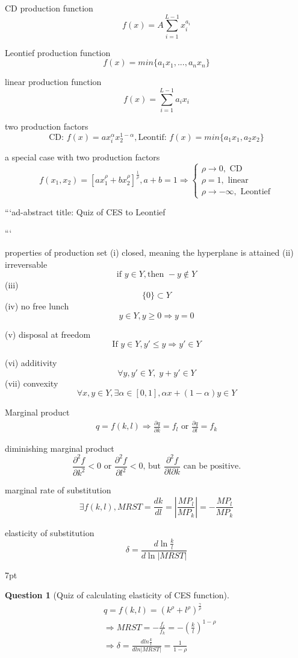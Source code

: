 \documentclass{article}
\newenvironment{redblock}{
\def\FrameCommand{
  \hspace{1pt}
    {\color{LightCoral}
    \vrule width 2pt}
    {\color{redshade}
    \vrule width 4pt}
  \colorbox{redshade}
}
\MakeFramed{
  \advance
  \hsize-
  \width
  \FrameRestore}
\noindent\hspace{-4.55pt}%
\begin{adjustwidth}{}{7pt}
\vspace{2pt}\vspace{2pt}
}
{\vspace{2pt}\end{adjustwidth}\endMakeFramed}
\newtheorem{question}{Question}
\begin{document}
CD production function
$$f(x)=A \sum\limits_{i=1}^{L-1}x_{i}^{a_{i}}$$

Leontief production function
$$f(x)=min\{a_{1} x_{1},...,a_{n}x_{n}\}$$

linear production function
$$f(x)=\sum\limits_{i=1}^{L-1}a_{i}x_{i}$$

two production factors
$$\text{CD: }f(x)=ax_{i}^{\alpha}x_{2}^{1-\alpha},\text{Leontif: }f(x)=min\{a_{1}x_{1},a_{2}x_{2}\}$$

a special case with two production factors
$$f(x_{1},x_{2})=[ax_{1}^{\rho}+bx_{2}^{\rho}]^{\frac{1}{\rho }},a+b=1 \Rightarrow \begin{cases} \rho \rightarrow 0, \text{ CD}\\
\rho=1, \text{ linear} \\
\rho \rightarrow -\infty ,\text{ Leontief}
\end{cases}$$

```ad-abstract
title: Quiz of CES to Leontief


```


properties of production set
(i)
closed, meaning the hyperplane is attained
(ii)
irreversable 
$$\text{if } y\in Y, \text{then }-y\notin Y$$
(iii)
$$\{0\}\subset Y$$
(iv)
no free lunch
$$y\in Y,y \geqslant 0 \Rightarrow y=0$$

(v)
disposal at freedom
$$\text{If } y \in Y, y' \leqslant y \Rightarrow y' \in Y$$

(vi)
additivity
$$\forall y,y' \in Y,\;y+y'\in Y$$
(vii)
convexity
$$\forall x,y \in Y,\exists \alpha\in [0,1],\alpha x+(1-\alpha)y\in Y$$

Marginal product
\begin{align}
q=f(k,l) \Rightarrow \frac{\partial q}{\partial k}=f_{l} \text{ or } \frac{\partial q}{\partial l}=f_{k}
\end{align}

diminishing marginal product
$$\frac{\partial ^{2}f}{\partial k^{2}} <0\text{ or } \frac{\partial ^{2}f}{\partial l^{2}}<0 \text{, but } \frac{\partial ^{2}f}{\partial l \partial k} \text{ can be positive.}$$

marginal rate of substitution
$$
\exists f(k,l), MRST=\frac{dk}{dl}=|\frac{MP_{l}}{MP_{k}}|=-\frac{MP_{l}}{MP_{k}}
$$

elasticity of substitution
$$
\delta=\frac{d\ln \frac{k}{l}}{d\ln |MRST|}
$$
\begin{redblock}
\begin{question}[Quiz of calculating elasticity of CES function]
\begin{align}
&q=f(k,l)=(k^{\rho}+l^{\rho})^{\frac{\gamma}{\rho}}
\\&\Rightarrow MRST=-\frac{f_{l}}{f_{k}}=-(\frac{k}{l})^{1-\rho}
\\&\Rightarrow \delta=\frac{dln \frac{k}{l}}{dln |MRST|}=\frac{1}{1-\rho}
\end{align}
\end{question}
\end{redblock}
\end{document}
